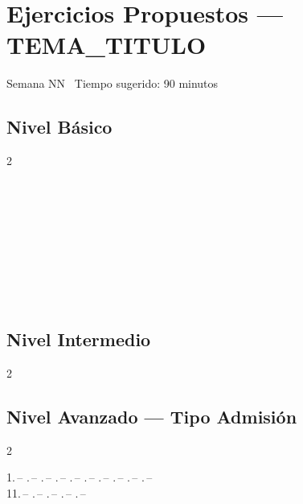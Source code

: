 
\section*{Ejercicios Propuestos — {{TEMA_TITULO}}}
{\small\sffamily\color{GrisMedio} Semana {{NN}} \textbullet\ Tiempo sugerido: 90 minutos}

\subsection*{Nivel Básico}
\begin{multicols}{2}

\ejercicio %
\begin{alternativas}
  \item $ $
  \item $ $
  \item $ $
  \item $ $
  \item $ $
\end{alternativas}
\vspace{0.3cm}

\end{multicols}

\subsection*{Nivel Intermedio}
\begin{multicols}{2}


\end{multicols}

\subsection*{Nivel Avanzado — Tipo Admisión}
\begin{multicols}{2}


\end{multicols}

\begin{tcolorbox}[enhanced, colback=GrisClaro, colframe=AzulPizarra,
    arc=2pt, boxrule=0.8pt, title={Clave de Respuestas},
    fonttitle=\bfseries\sffamily\small]
  \centering\sffamily\small
  1.\,-- .\,-- .\,-- .\,-- .\,-- .\,-- .\,-- .\,-- .\,-- .\,-- \\
  11.\,-- .\,-- .\,-- .\,-- .\,--
\end{tcolorbox}
